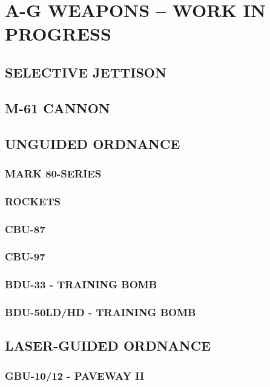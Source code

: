 \chapter{A-G WEAPONS -- WORK IN PROGRESS}
\localtableofcontents
\cleardoublepage

\section{SELECTIVE JETTISON}

\clearpage

\section{M-61 CANNON}

\clearpage 

\section{UNGUIDED ORDNANCE}

\subsection{MARK 80-SERIES}
\subsection{ROCKETS}
\subsection{CBU-87}
\subsection{CBU-97}
\subsection{BDU-33 - TRAINING BOMB}
\subsection{BDU-50LD/HD - TRAINING BOMB}

\clearpage 

\section{LASER-GUIDED ORDNANCE}

\subsection{GBU-10/12 - PAVEWAY II}
